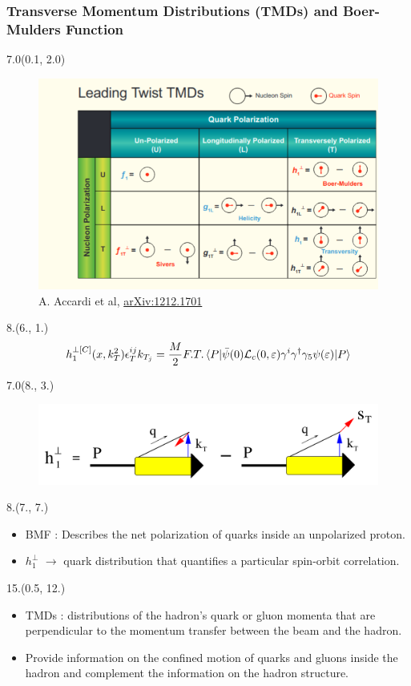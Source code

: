 \documentclass[12pt, xcolor={dvipsnames}, aspectratio = 169, sans, mathserif]{beamer}
\newenvironment{List}[2]
{\begin{textblock}{#1}#2
\begin{itemize}}
{\end{itemize}
\end{textblock}}
\newenvironment{Pic}[2]
{\begin{textblock}{#1}#2
\begin{figure}}
{\end{figure}
\end{textblock}}
\newcommand{\NewCaption}[3]{\caption{{#1}, \textcolor{blue}{\href{#2}{#3}}}}
\begin{document}
\begin{frame}
\frametitle{Transverse Momentum Distributions (TMDs) and Boer-Mulders Function}

\begin{Pic}{7.0}{(0.1, 2.0)}
  \NewCaption{A. Accardi et al}{https://arxiv.org/abs/1212.1701}{arXiv:1212.1701}
  \includegraphics[width=7.cm]{imgs/TMD.png}
\end{Pic}

\begin{textblock}{8.}(6., 1.)
\begin{equation*}
h_{1}^{\perp [C]} (x, k_{T}^{2})\epsilon_{T}^{ij}k_{T_{j}} = \frac{M}{2} F.T. \braket{P|\bar{\psi}(0)\mathcal{L}_{c}(0, \varepsilon)\gamma^{i}\gamma^{\dagger}\gamma_{5}\psi(\varepsilon)|P}
\end{equation*}
\end{textblock}

\begin{Pic}{7.0}{(8., 3.)}
  \includegraphics[width=7.cm]{imgs/BMF.png}
\end{Pic}

\begin{List}{8.}{(7., 7.)}

  \item BMF : Describes the net polarization of quarks inside an unpolarized proton.

  \item $h_{1}^{\perp}$ $\rightarrow$ quark distribution that quantifies a particular spin-orbit correlation.

\end{List}

\begin{List}{15.}{(0.5, 12.)}

  \item  TMDs : distributions of the hadron's quark or gluon momenta that are perpendicular to the momentum transfer between the beam and the hadron.

  \item Provide information on the confined motion of quarks and gluons inside the hadron and complement the information on the hadron structure.

\end{List}
\end{frame}
\end{document}
